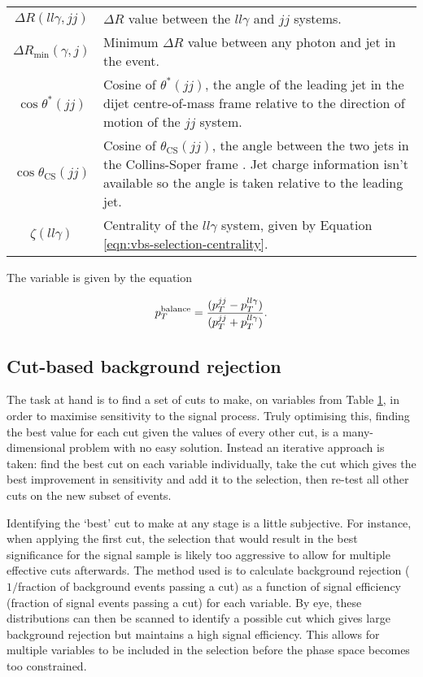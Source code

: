 \begin{table}[!p]
\begin{tabular}{c|p{10cm}}
    $\Delta R(ll\gamma, jj)$ &
    $\Delta R$ value between the $ll\gamma$ and $jj$ systems.
    \\
    $\Delta R_\text{min}(\gamma, j)$ &
    Minimum $\Delta R$ value between any photon and jet in the event.
    \\
    $\cos{\theta^*(jj)}$ &
    Cosine of $\theta^*(jj)$, the angle of the leading jet in the dijet
    centre-of-mass frame relative to the direction of motion of the $jj$ system.
    \\
    $\cos{\theta_\text{CS}(jj)}$ &
    Cosine of $\theta_\text{CS}(jj)$, the angle between the two jets in the
    Collins-Soper frame \cite{Collins1977}. Jet charge information isn't
    available so the angle is taken relative to the leading jet.
    \\
    $\zeta(ll\gamma)$ &
    Centrality of the $ll\gamma$ system, given by Equation
    \ref{eqn:vbs-selection-centrality}.
    \\
    \hline\hline
  \end{tabular}
  \label{tab:vzy-bdt-variables}
\end{table}

The variable \ptbalance is given by the equation

\begin{equation}
  p_T^\text{balance} = \frac{ (p_T^{jj} - p_T^{ll\gamma}) }
                    { (p_T^{jj} + p_T^{ll\gamma}) }.
  \label{eqn:vzy-bdt-ptbalance}
\end{equation}

\subsection{Cut-based background rejection}

The task at hand is to find a set of cuts to make, on variables from Table
\ref{tab:vzy-bdt-variables}, in order to maximise sensitivity to the signal
process. Truly optimising this, finding the best value for each cut given the
values of every other cut, is a many-dimensional problem with no easy
solution. Instead an iterative approach is taken: find the best cut on each
variable individually, take the cut which gives the best improvement
in sensitivity and add it to the selection, then re-test all other cuts on the
new subset of events.

Identifying the `best' cut to make at any stage is a little subjective. For
instance, when applying the first cut, the selection that would result in the best
significance for the signal sample is likely too aggressive to allow for
multiple effective cuts afterwards. The method used is to calculate background
rejection ($1/$fraction of background events passing a cut) as a function
of signal efficiency (fraction of signal events passing a cut) for each
variable. By eye, these distributions can then be scanned to identify a possible
cut which gives large background rejection but maintains a high signal
efficiency. This allows for multiple variables to be included in the selection
before the phase space becomes too constrained.

